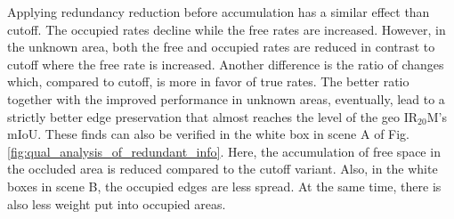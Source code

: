 Applying redundancy reduction before accumulation has a similar effect than cutoff. The occupied rates decline while the free rates are increased. However, in the unknown area, both the free and occupied rates are reduced in contrast to cutoff where the free rate is increased. Another difference is the ratio of changes which, compared to cutoff, is more in favor of true rates. The better ratio together with the improved performance in unknown areas, eventually, lead to a strictly better edge preservation that almost reaches the level of the geo IR$_{20}$M's mIoU. These finds can also be verified in the white box in scene A of Fig. \ref{fig:qual_analysis_of_redundant_info}. Here, the accumulation of free space in the occluded area is reduced compared to the cutoff variant. Also, in the white boxes in scene B, the occupied edges are less spread. At the same time, there is also less weight put into occupied areas.

